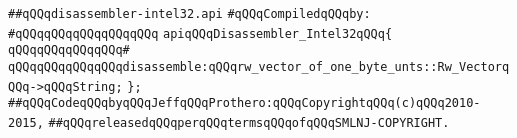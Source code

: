 \label{src/lib/src/disassembler-intel32.api}
\verb|##qQQqdisassembler-intel32.api|\newline
\newline
\verb|#qQQqCompiledqQQqby:|\newline
\verb|#qQQqqQQqqQQqqQQqqQQq|\newline
\newline
\newline
\newline
\verb|apiqQQqDisassembler_Intel32qQQq{|\newline
\verb|qQQqqQQqqQQqqQQq#|\newline
\verb|qQQqqQQqqQQqqQQqdisassemble:qQQqrw_vector_of_one_byte_unts::Rw_VectorqQQq->qQQqString;|\newline
\verb|};|\newline
\newline
\newline
\newline
\verb|##qQQqCodeqQQqbyqQQqJeffqQQqProthero:qQQqCopyrightqQQq(c)qQQq2010-2015,|\newline
\verb|##qQQqreleasedqQQqperqQQqtermsqQQqofqQQqSMLNJ-COPYRIGHT.|\newline

